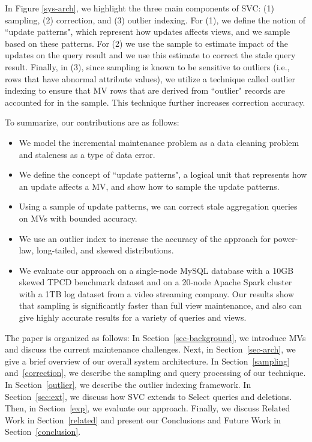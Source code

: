 In Figure \ref{sys-arch}, we highlight the three main components of SVC: (1) sampling, (2) correction, and (3) outlier indexing. For (1), we define the notion of ``update patterns", which represent how updates affects views, and we sample based on these patterns. For (2) we use the sample to estimate impact of the updates on the query result and we use this estimate to correct the stale query result.
Finally, in (3), since sampling is known to be sensitive to outliers (i.e., rows that have abnormal attribute values), we
utilize a technique called outlier indexing \cite{chaudhuri2001overcoming} to ensure that MV rows that are derived from ``outlier" records are accounted for in the sample.  This technique further increases correction accuracy.

To summarize, our contributions are as follows:
\begin{itemize}\vspace{-.45em}
\item We model the incremental maintenance problem as a data cleaning problem and staleness as a type of data error.\vspace{-.45em}
\item We define the concept of ``update patterns", a logical unit that represents how an update affects a MV, and show how to sample the update patterns. \vspace{-.45em}
\item Using a sample of update patterns, we can correct stale aggregation queries on MVs with bounded accuracy.\vspace{-.45em}
\item We use an outlier index to increase the accuracy of the approach for power-law, long-tailed, and skewed distributions.\vspace{-.45em}
\item We evaluate our approach on a single-node MySQL database with a 10GB skewed TPCD benchmark dataset and on a 20-node Apache Spark cluster with a 1TB log dataset from a video streaming company. Our results show that sampling is significantly faster than full view maintenance, and also can give highly accurate results for a variety of queries and views.\vspace{-.45em}
\end{itemize}

The paper is organized as follows: 
In Section~\ref{sec-background}, we introduce MVs and discuss the current maintenance challenges.
Next, in Section~\ref{sec-arch}, we give a brief overview of our overall system architecture.
In Section~\ref{sampling} and~\ref{correction}, we describe the sampling and query processing of our technique.
In Section~\ref{outlier}, we describe the outlier indexing framework.
In Section~\ref{sec:ext}, we discuss how SVC extends to Select queries and deletions.
Then, in Section~\ref{exp}, we evaluate our approach.
Finally, we discuss Related Work in Section~\ref{related} and present our Conclusions and Future Work in Section~\ref{conclusion}.
